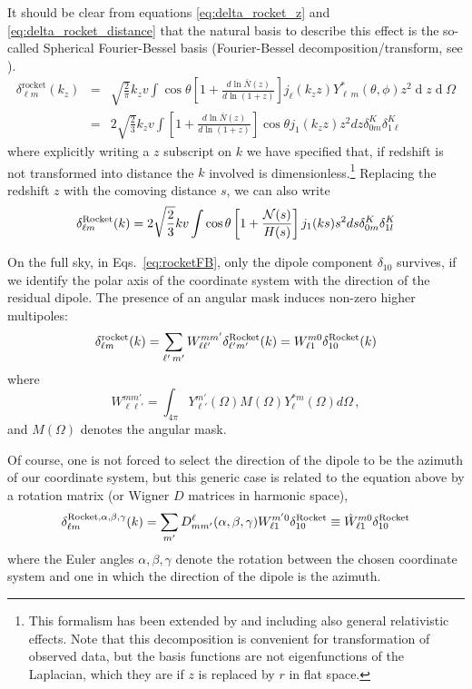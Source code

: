 \documentclass[a4paper,11pt]{article}
\renewcommand{\d}{\operatorname{d}}
\newcommand{\nn}{\nonumber}
\begin{document}
It should be clear from equations \eqref{eq:delta_rocket_z} and \eqref{eq:delta_rocket_distance} that the natural basis to describe this effect is the so-called Spherical Fourier-Bessel basis (Fourier-Bessel decomposition/transform, see \cite{HT95, Lahav:1993, HT97}).
\begin{eqnarray}
\delta^{\mathrm{rocket}}_{\ell m}(k_z)&=&\sqrt{\frac{2}{\pi}}k_z v \int\cos\theta\left[1 + \frac{d\ln \bar{N}(z)}{d\ln(1+z)}\right] j_\ell(k_zz)Y^*_{\ell\,m}(\theta,\phi)z^2 \d z \d\Omega \\ \nn
&=&2\sqrt{\frac{2}{3}}k_z v \int\left[1 + \frac{d\ln \bar{N}(z)}{d\ln(1+z)}\right]\cos\theta j_1(k_zz)z^2dz \delta^K_{0m}\delta^K_{1\ell}
\label{eq:rocketFB}
\end{eqnarray}
    where  explicitly writing a $z$ subscript on $k$ we have specified that, if redshift is not transformed into distance the $k$ involved is dimensionless.\footnote{This formalism has been extended by \cite{Yoo:2013tc} and \cite{Bertacca:2017dzm} including also general relativistic effects.  Note that this decomposition is convenient for transformation of observed data, but the basis functions are not eigenfunctions of the Laplacian, which they are if $z$ is replaced by $r$ in flat space.}
Replacing the redshift $z$ with the comoving distance $s$, we can also  write 
\begin{equation}
\delta^{\rm Rocket}_{\ell m}(k)=2\sqrt{\frac{2}{3}}kv\int \cos\theta \left[ 1  + \frac{{\cal N}(s)}{H(s)}\right] j_1(ks)s^2 ds\delta^K_{0m}\delta^K_{1l}
\label{eq:rocketFB2}
\end{equation}

On the full sky, in Eqs.~\eqref{eq:rocketFB}, only the dipole component $\delta_{10}$ survives, if we identify the polar axis of the coordinate system with the direction of the residual dipole.
The presence of an angular mask induces non-zero higher multipoles:
\begin{equation}
\delta^{\rm rocket}_{\ell m}(k)=\sum _{\ell'\, m'}W_{\ell \ell'}^{m m'}\delta^{\rm Rocket}_{\ell' m'}(k)=W_{\ell 1}^{m 0}\delta^{\rm Rocket}_{10}(k)
\end{equation}
 where
 \begin{equation}
W_{\ell \ell'}^{m m'}=\int_{4\pi}Y_{\ell'}^{m'}(\Omega)M(\Omega)Y_\ell^{* m}(\Omega)d\Omega\,,
 \end{equation}
and $M(\Omega)$ denotes the angular mask.

Of course, one is not forced to select the direction of the dipole to  be the azimuth of our coordinate system, but this generic case is related to the equation above by a rotation matrix  (or Wigner $D$ matrices in harmonic space),
\begin{equation}
\delta^{{\rm Rocket}, \alpha,\beta,\gamma}_{\ell m}(k) =  \sum_{m'}  D^\ell_{m m'}(\alpha,\beta,\gamma)W_{\ell 1}^{m' 0} \delta^{\rm Rocket}_{10}\equiv \hat{W}_{\ell 1}^{m0}\delta^{\rm Rocket}_{10}
\end{equation}
where the Euler angles $\alpha, \beta,\gamma$ denote the rotation between the chosen coordinate system and one in which the direction of the dipole is the azimuth.
\end{document}

